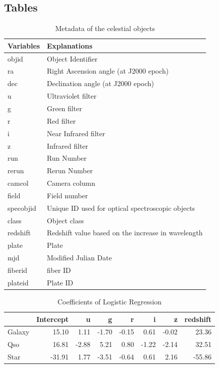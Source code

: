 \documentclass[
  11pt,
]{article}
\begin{document}
\quad

\newpage

\hypertarget{tables}{%
\subsection{Tables}\label{tables}}

\begin{table}[H]
\centering
\caption{Metadata of the celestial objects}
\label{tab:metadata}
\centering
\begin{tabular}[t]{ll}
\toprule
Variables & Explanations\\
\midrule
objid & Object Identifier\\
ra & Right Ascension angle (at J2000 epoch)\\
dec & Declination angle (at J2000 epoch)\\
u & Ultraviolet filter\\
g & Green filter\\
\addlinespace
r & Red filter\\
i & Near Infrared filter\\
z & Infrared filter\\
run & Run Number\\
rerun & Rerun Number\\
\addlinespace
camcol & Camera column\\
field & Field number\\
specobjid & Unique ID used for optical spectroscopic objects\\
class & Object class\\
redshift & Redshift value based on the increase in wavelength\\
\addlinespace
plate & Plate\\
mjd & Modified Julian Date\\
fiberid & fiber ID\\
plateid & Plate ID\\
\bottomrule
\end{tabular}
\end{table}

\begin{table}[H]
\centering
\caption{Coefficients of Logistic Regression}
\label{tab:lr}
\centering
\begin{tabular}[t]{lrrrrrrr}
\toprule
  & Intercept & u & g & r & i & z & redshift\\
\midrule
Galaxy & 15.10 & 1.11 & -1.70 & -0.15 & 0.61 & -0.02 & 23.36\\
Qso & 16.81 & -2.88 & 5.21 & 0.80 & -1.22 & -2.14 & 32.51\\
Star & -31.91 & 1.77 & -3.51 & -0.64 & 0.61 & 2.16 & -55.86\\
\bottomrule
\end{tabular}
\end{table}
\end{document}
